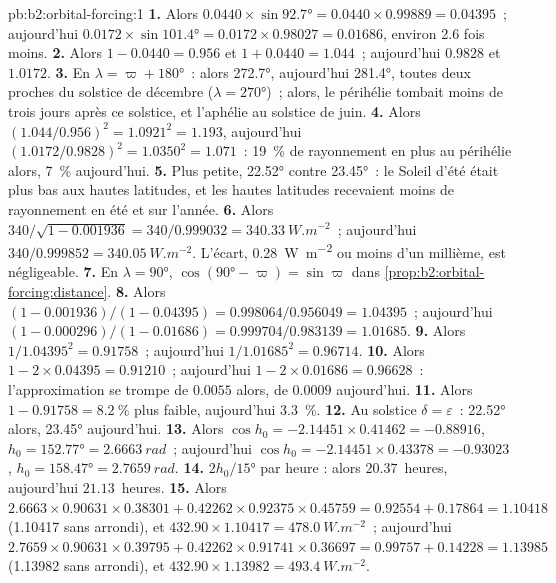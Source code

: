 \begin{solution}{pb:b2:orbital-forcing:1}
\textbf{1.} Alors $0.0440 \times \sin\ang{92.7} = 0.0440 \times 0.99889 = 0.04395$~; aujourd'hui $0.0172 \times
\sin\ang{101.4} = 0.0172 \times 0.98027 = 0.01686$, environ 2.6 fois moins.
\textbf{2.} Alors $1 - 0.0440 = 0.956$ et $1 + 0.0440 = 1.044$~; aujourd'hui $0.9828$ et $1.0172$.
\textbf{3.} En $\lambda = \varpi + \ang{180}$~: alors \ang{272.7}, aujourd'hui \ang{281.4}, toutes deux proches du
solstice de décembre ($\lambda = \ang{270}$)~; alors, le périhélie tombait moins de trois jours après ce solstice,
et l'aphélie au solstice de juin.
\textbf{4.} Alors $(1.044/0.956)^2 = 1.0921^2 = 1.193$, aujourd'hui $(1.0172/0.9828)^2 = 1.0350^2 = 1.071$~:
\qty{19}{\percent} de rayonnement en plus au périhélie alors, \qty{7}{\percent} aujourd'hui.
\textbf{5.} Plus petite, \ang{22.52} contre \ang{23.45}~: le Soleil d'été était plus bas aux hautes latitudes,
et les hautes latitudes recevaient moins de rayonnement en été et sur l'année.
\textbf{6.} Alors $340/\sqrt{1 - 0.001936} = 340/0.999032 = \qty{340.33}{W.m^{-2}}$~; aujourd'hui $340/0.999852
= \qty{340.05}{W.m^{-2}}$. L'écart, \qty{0.28}{W.m^{-2}} ou moins d'un millième,
est négligeable.
\textbf{7.} En $\lambda = \ang{90}$, $\cos(\ang{90} - \varpi) = \sin\varpi$ dans
\cref{prop:b2:orbital-forcing:distance}.
\textbf{8.} Alors $(1 - 0.001936)/(1 - 0.04395) = 0.998064/0.956049 = 1.04395$~; aujourd'hui $(1 -
0.000296)/(1 - 0.01686) = 0.999704/0.983139 = 1.01685$.
\textbf{9.} Alors $1/1.04395^2 = 0.91758$~; aujourd'hui $1/1.01685^2 = 0.96714$.
\textbf{10.} Alors $1 - 2 \times 0.04395 = 0.91210$~; aujourd'hui $1 - 2 \times 0.01686 = 0.96628$~: l'approximation
se trompe de $0.0055$ alors, de $0.0009$ aujourd'hui.
\textbf{11.} Alors $1 - 0.91758 = \qty{8.2}{\percent}$ plus faible, aujourd'hui \qty{3.3}{\percent}.
\textbf{12.} Au solstice $\delta = \varepsilon$~: \ang{22.52} alors, \ang{23.45} aujourd'hui.
\textbf{13.} Alors $\cos h_0 = -2.14451 \times 0.41462 = -0.88916$, $h_0 = \ang{152.77} =
\qty{2.6663}{rad}$~; aujourd'hui $\cos h_0 = -2.14451 \times 0.43378 = -0.93023$, $h_0 = \ang{158.47} =
\qty{2.7659}{rad}$.
\textbf{14.} $2h_0/\ang{15}$ par heure : alors $20.37$~heures, aujourd'hui $21.13$~heures.
\textbf{15.} Alors $2.6663 \times 0.90631 \times 0.38301 + 0.42262 \times 0.92375 \times 0.45759 =
0.92554 + 0.17864 = 1.10418$ (\num{1.10417} sans arrondi), et $432.90 \times 1.10417 =
\qty{478.0}{W.m^{-2}}$~; aujourd'hui $2.7659 \times 0.90631 \times 0.39795 + 0.42262 \times 0.91741 \times
0.36697 = 0.99757 + 0.14228 = 1.13985$ (\num{1.13982} sans arrondi), et $432.90 \times 1.13982 = \qty{493.4}{W.m^{-2}}$.

\end{solution}
